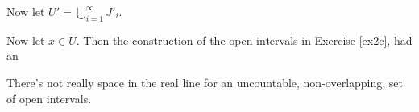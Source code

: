 \documentclass[11pt,oneside]{article}
\numberwithin{equation}{section}
\theoremstyle{definition}
\newtheorem{exercise}{Exercise}
\begin{document}
\begin{solution}
\begin{enumerate}[(a)]
    Now let $U' = \bigcup \limits _{i=1} ^ \infty J'_i$.

    Now let $x \in U$. Then the construction of the open intervals in
    Exercise \ref{ex2c}, had an 
    
      

    There's not really space in the real line for an uncountable,
    non-overlapping, set of open intervals. 
    

    
  \end{enumerate}
\end{solution}

\begin{comment}
\begin{exercise}
  problem
\end{exercise}
\begin{solution}
\begin{enumerate}[(a)]
\item
  first answer
\end{enumerate}
\end{solution}
\end{comment}
\end{document}
